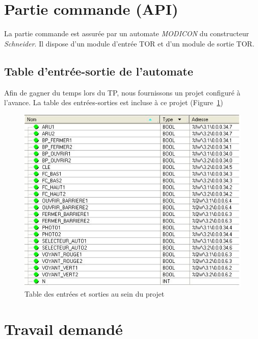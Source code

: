 \documentclass[11pt, multicol]{article}
\begin{document}

\section{Partie commande (API)}
La partie commande est assurée par un automate \textit{MODICON} du constructeur \textit{Schneider}. Il dispose d'un module d'entrée TOR et d'un module de sortie TOR.

\subsection{Table d'entrée-sortie de l'automate}
Afin de gagner du temps lors du TP, nous fournissons un projet configuré à l'avance. La table des entrées-sorties est incluse à ce projet (Figure~\ref{fig:entreesSorties})
\begin{figure}[h]
	\centering
	\includegraphics[width=.9\textwidth]{images/listeES}
	\caption{Table des entrées et sorties au sein du projet}
	\label{fig:entreesSorties}
\end{figure}
\pagebreak
\section{Travail demandé}
\end{document}
